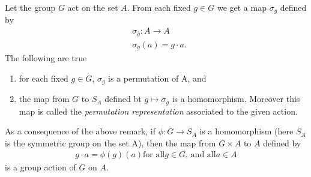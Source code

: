 \documentclass[../main]{subfiles}
\begin{document}
 
 \begin{nt}
  Let the group $G$ act on the set $A$. From each fixed $g\in G$ we get a map $\sigma_g$ defined by 
  \begin{align*}
   &\sigma_g \colon A \to A \\
   &\sigma_g(a)=g\cdot a.
  \end{align*}
  The following are true
  \begin{enumerate}
   \item for each fixed $g\in G$, $\sigma_g$ is a permutation of A, and 
   \item the map from $G$ to $S_A$ defined bt $g\mapsto \sigma_g$ is a homomorphism. Moreover this map is called the \textit{permutation representation} associated to the given action. 
  \end{enumerate}
 \end{nt}
 

 \begin{nt}
  As a consequence of the above remark, if $\phi \colon G \to S_A$ is a homomorphism (here $S_A$ is the symmetric group on the set A), then the map from $G\times A$ to $ A$ defined by 
  \begin{align*}
   g\cdot a = \phi(g)(a) \text{for all} g\in G \text{, and all} a\in A
  \end{align*}
  is a group action of $G$ on $A$.
 \end{nt}

 
\end{document}
